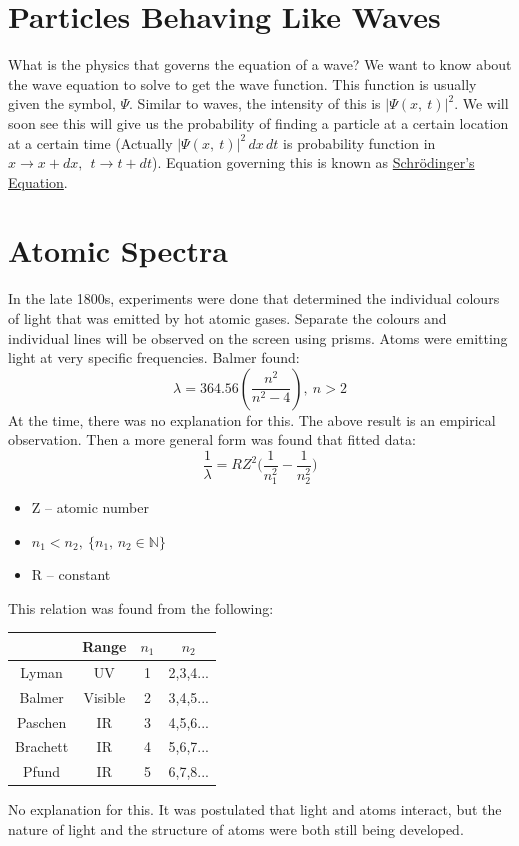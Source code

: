\documentclass[a4paper, 11pt, normalem]{report}
\begin{document}
\section{Particles Behaving Like Waves}
What is the physics that governs the equation of a wave?
We want to know about the wave equation to solve to get the wave function.
This function is usually given the symbol, $\Psi$.
Similar to waves, the intensity of this is $|\Psi(x,\:t)|^{2}$.
We will soon see this will give us the probability of finding a particle at a certain location at a certain time
(Actually $|\Psi(x,\:t)|^{2}\,dx\,dt$ is probability function in $x \rightarrow x + dx,~~t \rightarrow t + dt$).
Equation governing this is known as \underline{Schr\"{o}dinger's Equation}.

\section{Atomic Spectra}
In the late 1800s, experiments were done that determined the individual colours of light that was emitted by hot atomic gases.
Separate the colours and individual lines will be observed on the screen using prisms.
Atoms were emitting light at very specific frequencies.
Balmer found:
\begin{equation}
    \lambda = 364.56\left(\frac{n^{2}}{n^{2} - 4}\right),~n > 2
\end{equation}
At the time, there was no explanation for this.
The above result is an empirical observation.
Then a more general form was found that fitted data:
\begin{equation}
    \frac{1}{\lambda} = RZ^{2}\Big(\frac{1}{n_{1}^{2}} - \frac{1}{n_{2}^{2}}\Big)
\end{equation}
\begin{itemize}
    \item Z -- atomic number
    \item $n_{1} < n_{2},~\{n_{1},\,n_{2} \in \mathbb{N}\}$
    \item R -- constant
\end{itemize}
This relation was found from the following:
\begin{table}[H]
    \centering
    \begin{tabular}{|c|ccc|}
        \hline
        \rowcolor{lightgray} & Range   & $n_{1}$ & $n_{2}$\\
        \hline
        Lyman    & UV      & 1       & 2,3,4... \\
        Balmer   & Visible & 2       & 3,4,5... \\
        Paschen  & IR      & 3       & 4,5,6... \\
        Brachett & IR      & 4       & 5,6,7... \\
        Pfund    & IR      & 5       & 6,7,8... \\
        \hline
    \end{tabular}
\end{table}
No explanation for this.
It was postulated that light and atoms interact, but the nature of light and the structure of atoms were both still being developed.
\end{document}
